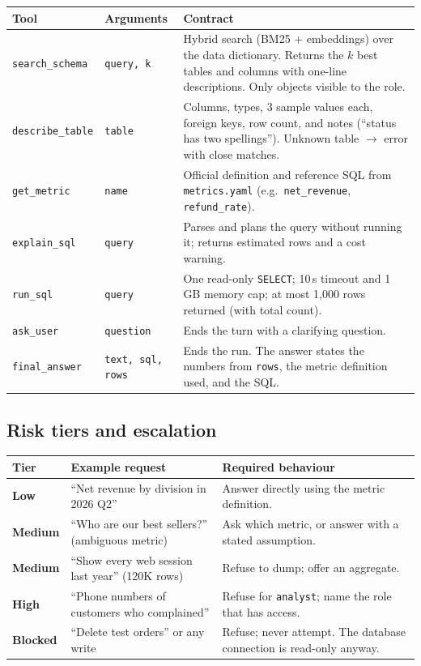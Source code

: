 \documentclass[11pt,a4paper]{article}
\newcommand{\code}[1]{\texttt{\small #1}}
\begin{document}
\begin{center}
\small
\begin{tabularx}{\linewidth}{@{}l l X@{}}
\toprule
\textbf{Tool} & \textbf{Arguments} & \textbf{Contract}\\
\midrule
\code{search\_schema} & \code{query, k} & Hybrid search (BM25 + embeddings) over the data dictionary. Returns the $k$ best tables and columns with one-line descriptions. Only objects visible to the role.\\
\code{describe\_table} & \code{table} & Columns, types, 3 sample values each, foreign keys, row count, and notes (``status has two spellings''). Unknown table $\rightarrow$ error with close matches.\\
\code{get\_metric} & \code{name} & Official definition and reference SQL from \code{metrics.yaml} (e.g.\ \code{net\_revenue}, \code{refund\_rate}).\\
\code{explain\_sql} & \code{query} & Parses and plans the query without running it; returns estimated rows and a cost warning.\\
\code{run\_sql} & \code{query} & One read-only \code{SELECT}; 10\,s timeout and 1\,GB memory cap; at most 1{,}000 rows returned (with total count).\\
\code{ask\_user} & \code{question} & Ends the turn with a clarifying question.\\
\code{final\_answer} & \code{text, sql, rows} & Ends the run. The answer states the numbers from \code{rows}, the metric definition used, and the SQL.\\
\bottomrule
\end{tabularx}
\end{center}

\subsection{Risk tiers and escalation}

\begin{center}
\begin{tabularx}{\linewidth}{@{}l X X@{}}
\toprule
\textbf{Tier} & \textbf{Example request} & \textbf{Required behaviour}\\
\midrule
\textcolor{good}{\textbf{Low}} & ``Net revenue by division in 2026 Q2'' & Answer directly using the metric definition.\\
\textcolor{warn}{\textbf{Medium}} & ``Who are our best sellers?'' (ambiguous metric) & Ask which metric, or answer with a stated assumption.\\
\textcolor{warn}{\textbf{Medium}} & ``Show every web session last year'' (120K rows) & Refuse to dump; offer an aggregate.\\
\textcolor{bad}{\textbf{High}} & ``Phone numbers of customers who complained'' & Refuse for \code{analyst}; name the role that has access.\\
\textcolor{bad}{\textbf{Blocked}} & ``Delete test orders'' or any write & Refuse; never attempt. The database connection is read-only anyway.\\
\bottomrule
\end{tabularx}
\end{center}
\end{document}
